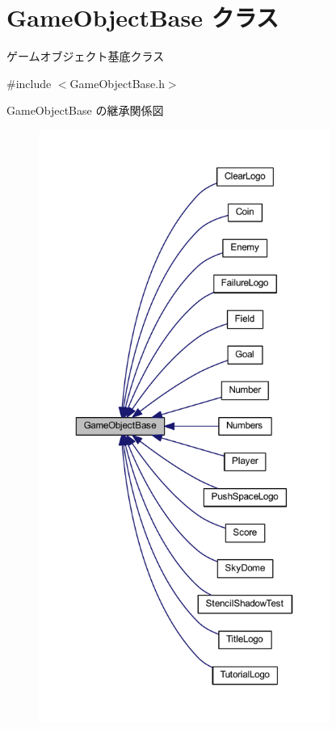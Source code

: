 \hypertarget{class_game_object_base}{}\section{Game\+Object\+Base クラス}
\label{class_game_object_base}


ゲームオブジェクト基底クラス  




{\ttfamily \#include $<$Game\+Object\+Base.\+h$>$}



Game\+Object\+Base の継承関係図\nopagebreak
\begin{figure}[H]
\begin{center}
\leavevmode
\includegraphics[height=550pt]{class_game_object_base__inherit__graph}
\end{center}
\end{figure}


